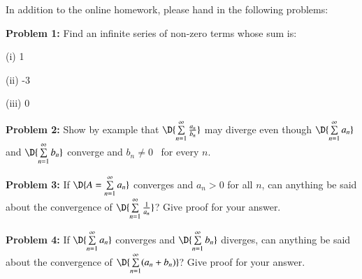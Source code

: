 \documentclass[11pt]{article}
\begin{document}


In addition to the online homework, please hand in the following problems:

\vspace{0.2cm}

{\bf Problem 1:} Find an infinite series of non-zero terms whose sum is: 

\quad (i) 1

\quad (ii) -3

\quad (iii) 0

\vspace{0.2cm}

%

{\bf Problem 2:} Show by example that $\D{\sum \limits_{n=1}^{\infty} \frac{a_n}{b_n}}$ may diverge even though $\D{\sum \limits_{n=1}^{\infty} a_n}$ and $\D{\sum \limits_{n=1}^{\infty} b_n}$ converge and $b_n \ne 0$ \, for every $n$.

\vspace{0.2cm}

%
%
%

{\bf Problem 3:} If $\D{A = \sum \limits_{n=1}^{\infty} a_n}$ converges and $a_n > 0$ for all $n$, can anything be said about the convergence of $\D{\sum \limits_{n=1}^{\infty} \frac{1}{a_n}}$? Give proof for your answer.

\vspace{0.2cm}

%

{\bf Problem 4:} If $\D{\sum \limits_{n=1}^{\infty} a_n}$ converges and $\D{\sum \limits_{n=1}^{\infty} b_n}$ diverges, can anything be said about the convergence of $\D{\sum \limits_{n=1}^{\infty} (a_n + b_n)}$? Give proof for your answer.
\end{document}
